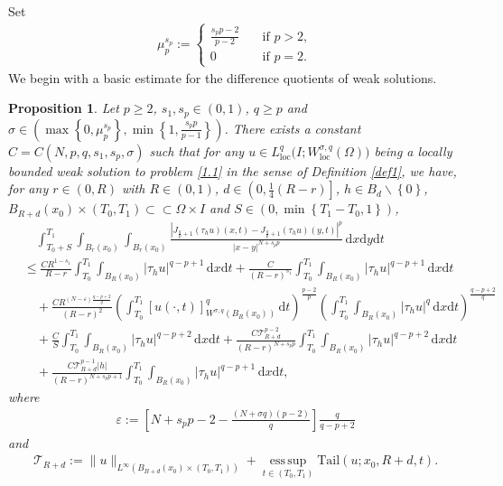 \documentclass[reqno,10pt]{amsart}
\numberwithin{equation}{section}
\newtheorem{proposition}[theorem]{Proposition}
\begin{document}
Set
\begin{align*}
	\mu^{s_p}_p:=
	\begin{cases}
		\frac{s_pp-2}{p-2}\quad &\text{if }p>2,\\[2mm]
		0\quad &\text{if }p=2.
	\end{cases}
\end{align*}
We begin with a basic estimate for the difference quotients of weak solutions.

\begin{proposition}
	\label{pro4}
	Let $p\ge2$, $s_1,s_p\in (0,1)$, $q\ge p$ and $\sigma\in\left( \max\left\lbrace 0,\mu^{s_p}_p\right\rbrace, \min\left\lbrace 1,\frac{s_pp}{p-1}\right\rbrace  \right) $. There exists a constant $C=C(N,p,q,s_1,s_p,\sigma)$ such that for any $u\in L^q_{\mathrm{loc}}\bigl( I;W^{\sigma,q}_{\mathrm{loc}}(\Omega)\bigl)$ being a locally bounded weak solution to problem \eqref{1.1} in the sense of Definition \ref{def1}, we have, for any $r\in(0,R)$ with $R\in(0,1)$, $d\in \left( 0,\frac{1}{4}(R-r)\right]$, $h\in B_d\backslash\left\lbrace0\right\rbrace$,  $B_{R+d}(x_0)\times(T_0,T_1)\subset\subset\Omega\times I$ and $S\in (0,\min\left\lbrace T_1-T_0,1\right\rbrace )$,
	\begin{align}
		\label{4.0}
		&\quad\int_{T_0+S}^{T_1}\int_{B_r(x_0)}\int_{B_r(x_0)}\frac{\left| J_{\frac{q}{p}+1}(\tau_hu)(x,t)-J_{\frac{q}{p}+1}(\tau_hu)(y,t)\right|^p}{|x-y|^{N+s_pp}}\,\mathrm{d}x\mathrm{d}y\mathrm{d}t\nonumber\\
		&\le \frac{CR^{1-s_1}}{R-r}\int_{T_0}^{T_1}\int_{B_R(x_0)}\left|\tau_hu\right|^{q-p+1}\,\mathrm{d}x\mathrm{d}t+\frac{C}{(R-r)^{s_1}}\int_{T_0}^{T_1}\int_{B_R(x_0)}\left|\tau_hu\right|^{q-p+1}\,\mathrm{d}x\mathrm{d}t\nonumber\\
		&\quad+\frac{CR^{(N-\varepsilon)\frac{q-p+2}{q}}}{(R-r)^2}\left( \int_{T_0}^{T_1}[u(\cdot,t)]^{q}_{W^{\sigma,q}(B_R(x_0))}\,\mathrm{d}t\right)^\frac{p-2}{p} \left(\int_{T_0}^{T_1}\int_{B_{R}(x_0)}\left|\tau_hu\right|^{q}\,\mathrm{d}x\mathrm{d}t\right)^{\frac{q-p+2}{q}}\nonumber\\
		&\quad+\frac{C}{S}\int_{T_0}^{T_1}\int_{B_R(x_0)}\left|\tau_hu\right|^{q-p+2}\,\mathrm{d}x\mathrm{d}t+\frac{C\mathcal{T}_{R+d}^{p-2}}{(R-r)^{N+s_pp}}\int_{T_0}^{T_1}\int_{B_R(x_0)}\left|\tau_hu\right|^{q-p+2}\,\mathrm{d}x\mathrm{d}t\nonumber\\
		&\quad+\frac{C\mathcal{T}_{R+d}^{p-1}|h|}{(R-r)^{N+s_pp+1}}\int_{T_0}^{T_1}\int_{B_R(x_0)}\left|\tau_hu\right|^{q-p+1}\,\mathrm{d}x\mathrm{d}t,
	\end{align}
	where
	\begin{align*}
		\varepsilon:=\left[N+s_pp-2-\frac{(N+\sigma q)(p-2)}{q}\right]\frac{q}{q-p+2}
	\end{align*}
	and
	\begin{align*}
		\mathcal{T}_{R+d}:=\|u\|_{L^\infty\left(B_{B+d}(x_0)\times(T_0,T_1)\right)}+\operatorname*{ess\,sup}_{t\in(T_0,T_1)}\mathrm{Tail}(u;x_0,R+d,t). 
	\end{align*}
\end{proposition}
\end{document}
